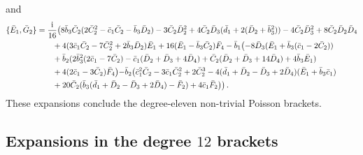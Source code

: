 \documentclass[10pt]{amsart}
\theoremstyle{definition}
\theoremstyle{corollary}
\theoremstyle{remark}
\theoremstyle{conclusion}
\begin{document}
and \begin{align}
\{\bar{E}_1, \bar{G}_2\}&=\frac{{\rm i}}{16}\bigl(8 \bar{b}_3 \bar{C}_2(2\bar{C}_2^2-\bar{c}_1 \bar{C}_2-\bar{b}_3 \bar{D}_2)-3 \bar{C}_2 \bar{D}_2^2+4\bar{C}_2 \bar{D}_3(\bar{d}_1+2(\bar{D}_2+\bar{b}_3^2))-4 \bar{C}_2 \bar{D}_3^2+8 \bar{C}_2 \bar{D}_2 \bar{D}_4\nonumber\\
& \hskip 0.7 cm +4(3 \bar{c}_1 \bar{C}_2-7 \bar{C}_2^2+2\bar{b}_3 \bar{D}_2)\bar{E}_1+16 (\bar{E}_1-\bar{b}_3 \bar{C}_2)\bar{F}_4-\bar{b}_1 \bigl( -8 \bar{D}_3(\bar{E}_1+\bar{b}_3(\bar{c}_1-2\bar{C}_2))\nonumber\\
& \hskip 0.7 cm +\bar{b}_2(2\bar{b}_3^2(2\bar{c}_1-7\bar{C}_2)-\bar{c}_1(\bar{D}_2+\bar{D}_3+4\bar{D}_4)+\bar{C}_2(\bar{D}_2+\bar{D}_3+14\bar{D}_4)+4\bar{b}_3 \bar{E}_1)\nonumber\\
& \hskip 0.7 cm +4(2\bar{c}_1-3\bar{C}_2)\bar{F}_4\bigl)-\bar{b}_2 \bigl( \bar{c}_1^2\bar{C}_2-3\bar{c}_1\bar{C}_2^2+2\bar{C}_2^3-4(\bar{d}_1+\bar{D}_2-\bar{D}_3+2\bar{D}_4)(\bar{E}_1+\bar{b}_3 \bar{c}_1)\nonumber\\
& \hskip 0.7 cm+20 \bar{C}_2(\bar{b}_3(\bar{d}_1+\bar{D}_2-\bar{D}_3+2\bar{D}_4)-\bar{F}_2)+4\bar{c}_1 \bar{F}_2\bigl) \bigl) \, .
\end{align} These expansions conclude the degree-eleven non-trivial Poisson brackets.
\vskip 0.5cm

\subsection{Expansions in the degree $12$ brackets}
\end{document}
